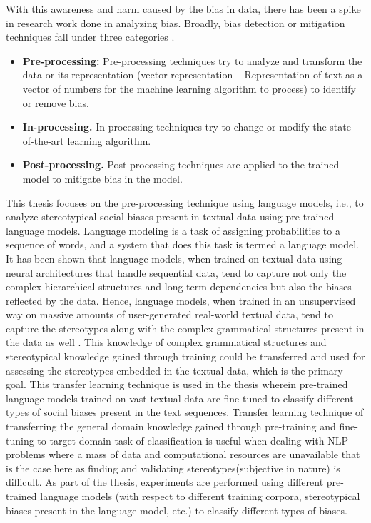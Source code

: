 With this awareness and harm caused by the bias in data, there has been a spike in research work done in analyzing bias.
Broadly, bias detection or mitigation techniques fall under three categories \cite{mehrabi2019survey}.
\begin{itemize}
    \item \textbf{Pre-processing:} Pre-processing techniques try to analyze and transform the data or its representation (vector representation – Representation of text as a vector of numbers for the machine learning algorithm to process) to identify or remove bias.
    \item \textbf{In-processing.} In-processing techniques try to change or modify the state-of-the-art learning algorithm.
    \item  \textbf{Post-processing.} Post-processing techniques are applied to the trained model to mitigate bias in the model.
\end{itemize}   
This thesis focuses on the pre-processing technique using language models, i.e., to analyze stereotypical social biases present in textual data using pre-trained language models. Language modeling is
a task of assigning probabilities to a sequence of words, and a system that does this task is termed a language model\cite{DNLP}. It has been shown that language
models, when trained on textual data using neural architectures that handle sequential data, tend to capture not only the complex hierarchical structures and long-term dependencies but also the biases reflected by the data. Hence,
language models, when trained in an unsupervised way on massive amounts of user-generated real-world textual data, tend to capture the stereotypes along with the complex grammatical structures present in the data as well \cite{nadeem2020stereoset}\cite{ruder2019neural}\cite{brown2020language}. This knowledge of complex grammatical structures and stereotypical knowledge gained through training could be transferred and used for assessing the stereotypes embedded in the textual data, which is the primary goal. This transfer learning technique is used in the thesis wherein pre-trained language models trained on vast textual data are fine-tuned to classify different types of social biases present in the text sequences. Transfer learning technique of transferring
the general domain knowledge gained through pre-training and fine-tuning to target domain task of classification is useful when dealing with NLP problems where a mass of data and computational resources are unavailable \cite{transfer_Learning} that is the case here as finding and validating stereotypes(subjective in nature) is difficult. As part of the thesis, experiments are performed using different pre-trained language models (with respect to different training corpora, stereotypical biases present in the language model, etc.) to classify different types of biases.
\\

